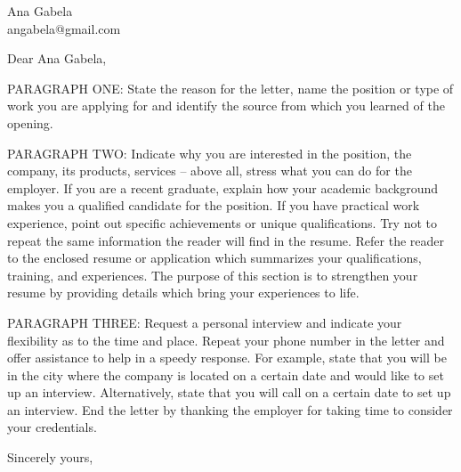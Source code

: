 \documentclass[
	parskip=half, %
	enlargefirstpage=true, %
]{scrlttr2} %
\begin{document}

\begin{letter}{
	Ana Gabela \\
	angabela@gmail.com
}

\opening{Dear Ana Gabela,}

PARAGRAPH ONE: State the reason for the letter, name the position or type of work you are applying for and identify the source from which you learned of the opening.

PARAGRAPH TWO: Indicate why you are interested in the position, the company, its products, services -- above all, stress what you can do for the employer. If you are a recent graduate, explain how your academic background makes you a qualified candidate for the position. If you have practical work experience, point out specific achievements or unique qualifications. Try not to repeat the same information the reader will find in the resume. Refer the reader to the enclosed resume or application which summarizes your qualifications, training, and experiences. The purpose of this section is to strengthen your resume by providing details which bring your experiences to life.

PARAGRAPH THREE: Request a personal interview and indicate your flexibility as to the time and place. Repeat your phone number in the letter and offer assistance to help in a speedy response. For example, state that you will be in the city where the company is located on a certain date and would like to set up an interview. Alternatively, state that you will call on a certain date to set up an interview. End the letter by thanking the employer for taking time to consider your credentials.

Sincerely yours, \\


\end{letter}
\end{document}
